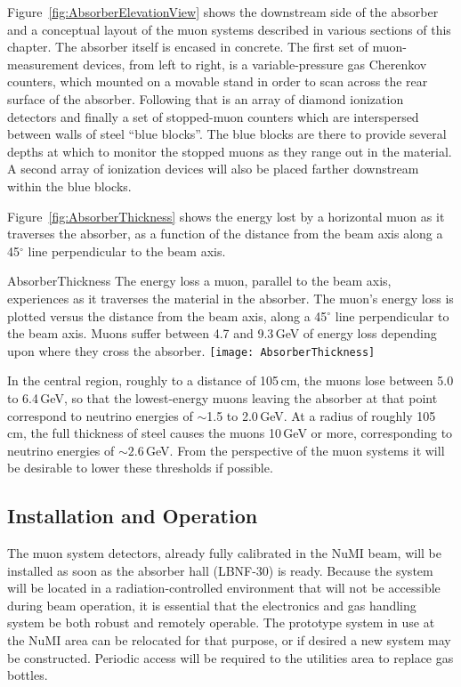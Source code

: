Figure~\ref{fig:AbsorberElevationView} shows the downstream side of
the absorber and a conceptual layout of the muon systems described in
various sections of this chapter.  The absorber itself is encased in
concrete. The first set of muon-measurement devices, from left to
right, is a variable-pressure gas Cherenkov counters, which mounted on
a movable stand in order to scan across the rear surface of the
absorber.  Following that is an array of diamond ionization detectors
and finally a set of stopped-muon counters which are interspersed
between walls of steel ``blue blocks''.  The blue blocks are there to
provide several depths at which to monitor the stopped muons as they
range out in the material. A second array of ionization devices will
also be placed farther downstream within the blue blocks.


Figure~\ref{fig:AbsorberThickness} shows the energy lost by a
horizontal muon as it traverses the absorber, as a function of the
distance from the beam axis along a 45$^\circ$ line perpendicular to the beam axis. 
\begin{cdrfigure}{AbsorberThickness}
{The energy loss a muon, parallel to the beam axis, experiences as it traverses 
the material in the absorber. The muon's energy loss is plotted versus the distance 
from the beam axis, along a 45$^\circ$ line perpendicular to the beam axis. Muons 
suffer between 4.7 and 9.3\,GeV of energy loss depending upon where they cross the absorber.}
\texttt{[image: AbsorberThickness]}
\end{cdrfigure}
In the central region, roughly to a distance of 105\,cm, the muons lose
between 5.0 to 6.4\,GeV, so that the lowest-energy muons leaving the
absorber at that point correspond to neutrino energies of $\sim$1.5
to 2.0\,GeV. At a radius of roughly 105\,cm, the full thickness of steel
causes the muons 10\,GeV or more, corresponding to neutrino energies of
$\sim 2.6$\,GeV. From the perspective of the muon systems it will be
desirable to lower these thresholds if possible.


%


\subsection{Installation and Operation}

The muon system detectors, already fully calibrated in the NuMI beam,
will be installed as soon as the absorber hall (LBNF-30) is ready.
Because the system will be located in a radiation-controlled
environment that will not be accessible during beam operation, it is
essential that the electronics and gas handling system be both robust
and remotely operable.  The prototype system in use at the NuMI area
can be relocated for that purpose, or if desired a new system may be
constructed.  Periodic access will be required to the utilities area
to replace gas bottles.

